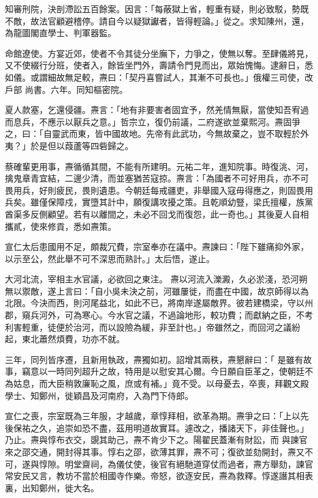 \begin{pinyinscope}
 知審刑院，決剖滯訟五百餘案。因言：「每蔽獄上省，輕重有疑，則必致駁，勢既不敵，故法官顧避稽停。請自今以疑獄讞者，皆得輕論。」從之。求知陳州，還，為龍圖閣直學士、判軍器監。



 命館遼使。方宴近郊，使者不令其徒分坐廡下，力爭之，使無以奪。至肆儀將見，又不使綴行分班，使者入，餘皆坐門外，壽請令門見而出，眾始愧悔。逮辭日，悉如儀。或謂細故無足較，燾曰：「契丹喜嘗試人，其漸不可長也。」俄權三司使，改戶部
 尚書。六年。同知樞密院。



 夏人款塞，乞還侵疆。燾言：「地有非要害者固宜予，然羌情無厭，當使知吾宥過而息兵，不應示以厭兵之意。」哲宗立，復仍前議，二府遂欲並棄熙河。燾固爭之，曰：「自靈武而東，皆中國故地。先帝有此武功，今無故棄之，豈不取輕於外夷？」於是但以葭蘆等四砦歸之。



 蔡確輩更用事，燾循循其間，不能有所建明。元祐二年，進知院事。時復洮、河，擒鬼章青宜結，二邊少清，而並塞猶苦寇掠。燾言：「為國者不可好用兵，亦不可
 畏用兵，好則疲民，畏則遺患。今朝廷每戒疆吏，非舉國入寇毋得應之，則固畏用兵矣。雖僅保障戍，實墮其計中，願復講攻擾之策。且乾順幼豎，梁氏擅權，族黨酋渠多反側顧望。若有以離間之，未必不回戈而復怨，此一奇也。」其後夏人自相攜貳，使來修貢，悉如燾策。



 宣仁太后患國用不足，頗裁冗費，宗室奉亦在議中。燾諫曰：「陛下雖痛抑外家，以示至公，然此舉不可不深思而熟計。」太后悟，遂止。



 大河北流，宰相主水官議，必欲回之東注。
 燾以河流入濼澱，久必淤淺，恐河朔無以禦敵，遂上言曰：「自小吳未決之前，河雖屢徙，而盡在中國，故京師得以為北限。今決而西，則河尾益北，如此不已，將南岸遂屬敵界。彼若建橋梁，守以州郡，窺兵河外，可為寒心。今水官之議，不過論地形，較功費；而獻納之臣，不考利害輕重，徒便於治河，而以設險為緩，非至計也。」帝雖然之，而回河之議紛起，東北蕭然煩費，功亦不就。



 三年，同列皆序遷，且新用執政，燾獨如初。詔增其兩秩，燾懇辭曰：「
 是雖有故事，竊意以一時同列超升之故，特用是以慰安其心爾。今日願自臣革之，使朝廷不為姑息，而大臣稍敦廉恥之風，庶或有補。」竟不受。以母憂去，卒喪，拜觀文殿學士、知鄭州，徙穎昌及河南府，入為門下侍郎。



 宣仁之喪，宗室既為三年服，才越歲，章惇拜相，欲革為期。燾爭之曰：「上以先後保祐之久，追崇如恐不盡，茲用明道故實耳。遽改之，播諸天下，非佳聲也。」乃止。燾與惇布衣交，覬其助己，燾不肯少下之。陽翟民蓋漸有財訟，而
 與諫官來之邵交通，開封得其事。惇右之邵，欲薄其罪，燾不可；復欲並劾開封，燾又不可，遂與惇隙。明堂齋祠，為儀仗使，後官有絕馳道穿仗而過者，燾方舉劾，諫官常安民又言，教坊不當於相國寺作樂。帝怒，欲逐安民，燾為救釋。惇遂譖其相表裏，出知鄭州，徙大名。




\end{pinyinscope}

